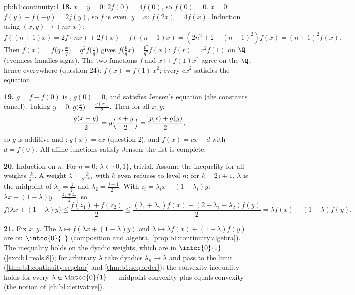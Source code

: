 \begin{solution}{pb:b1:continuity:1}
\textbf{18.} $x = y = 0$: $2f(0) = 4f(0)$, so $f(0) = 0$. $x =
0$: $f(y) + f(-y) = 2f(y)$, so $f$ is even. $y = x$: $f(2x) =
4f(x)$. Induction using $(x, y) \to (nx, x)$:
\[
f((n{+}1)x) = 2f(nx) + 2f(x) - f((n{-}1)x)
= (2n^2 + 2 - (n-1)^2) f(x) = (n+1)^2 f(x) .
\]
Then $f(x) = f\bigl(q\cdot\frac xq\bigr) = q^2 f\bigl(\frac
xq\bigr)$ gives $f\bigl(\frac pq x\bigr) = \frac{p^2}{q^2}f(x)$:
$f(r) = r^2 f(1)$ on $\Q$ (evenness handles signs). The two
 functions $f$ and $x \mapsto f(1)x^2$ agree on the
  $\Q$, hence everywhere (question 24): $f(x) =
f(1)\,x^2$; every $cx^2$ satisfies the equation.

\textbf{19.} $g = f - f(0)$ is , $g(0) = 0$, and
satisfies Jensen's equation (the constants cancel). Taking $y =
0$: $g\bigl(\frac x2\bigr) = \frac{g(x)}{2}$. Then for all $x,
y$:
\[
\frac{g(x + y)}{2} = g\Bigl(\frac{x+y}{2}\Bigr)
= \frac{g(x) + g(y)}{2} ,
\]
so $g$ is additive and : $g(x) = cx$ (question 2), and
$f(x) = cx + d$ with $d = f(0)$. All affine functions satisfy
Jensen: the list is complete.

\textbf{20.} Induction on $n$. For $n = 0$: $\lambda \in \{0,
1\}$, trivial. Assume the inequality for all weights
$\frac{k}{2^n}$. A weight $\lambda = \frac{k}{2^{n+1}}$ with $k$
even reduces to level $n$; for $k = 2j + 1$, $\lambda$ is the
midpoint of $\lambda_1 = \frac{j}{2^n}$ and $\lambda_2 =
\frac{j+1}{2^n}$. With $z_i = \lambda_i x + (1 - \lambda_i)y$:
$\lambda x + (1-\lambda)y = \frac{z_1 + z_2}{2}$, so
\[
f\bigl(\lambda x + (1{-}\lambda)y\bigr)
\leq \frac{f(z_1) + f(z_2)}{2}
\leq \frac{(\lambda_1 + \lambda_2)f(x) + (2 - \lambda_1 -
\lambda_2)f(y)}{2}
= \lambda f(x) + (1 - \lambda)f(y) .
\]

\textbf{21.} Fix $x, y$. The  $\lambda \mapsto f(\lambda x +
(1 - \lambda)y)$ and $\lambda \mapsto \lambda f(x) + (1 -
\lambda)f(y)$ are  on $\intcc{0}{1}$ (composition and
algebra, \cref{prop:b1:continuity:algebra}). The inequality
holds on the dyadic weights, which are  in $\intcc{0}{1}$
(\cref{exo:b1:reals:8}); for arbitrary $\lambda$ take dyadics
$\lambda_n \to \lambda$ and pass to the limit
(\cref{thm:b1:continuity:seqchar} and \cref{thm:b1:seq:order}):
the convexity inequality holds for every $\lambda \in
\intcc{0}{1}$ --- midpoint convexity plus  equals
convexity (the notion of \cref{ch:b1:derivative}).


\end{solution}
